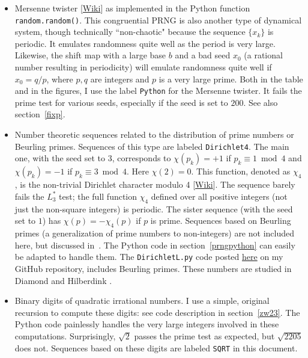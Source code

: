 \documentclass[oneside,10pt]{book}
\begin{document}
\begin{itemize}
\item \textcolor{index}{Mersenne twister} [\href{https://en.wikipedia.org/wiki/Mersenne_Twister}{Wiki}] as
 implemented in the Python function \texttt{random.random()}. This congruential PRNG is also another type of dynamical system,
 though technically ``non-chaotic" because the sequence $\{x_k\}$
is periodic. It emulates randomness quite well as the period is very large.
 Likewise, the shift map with a large base $b$ and a bad seed $x_0$ (a rational number resulting in periodicity) will emulate
 randomness quite well if $x_0=q/p$, where $p,q$ are integers and $p$ is a very large prime. Both in the table and in the figures, I use the label \texttt{Python} for the Mersenne twister. It fails the prime test for various seeds, especially if the seed is set to $200$. See also section~\ref{fixp}.
\item Number theoretic sequences related to the distribution of prime numbers or
 \textcolor{index}{Beurling primes}. Sequences of this type are labeled \texttt{Dirichlet4}. The main one, with the seed set to $3$, corresponds to
 $\chi(p_k)=+1$ if $p_k \equiv 1 \bmod 4$ and $\chi(p_k)=-1$ if $p_k \equiv 3\bmod 4$. Here $\chi(2)=0$. This function, denoted as $\chi_4$, is the non-trivial \textcolor{index}{Dirichlet character modulo 4} [\href{https://en.wikipedia.org/wiki/Dirichlet_character}{Wiki}]. The sequence barely fails the $L^*_3$ test; the full function $\chi_4$ defined over all positive integers (not just the non-square integers) is periodic. The sister sequence (with the seed set to $1$) has
 $\chi(p)=-\chi_4(p)$ if $p$ is prime. Sequences based on Beurling primes (a generalization of prime numbers to non-integers) are not included here, but discussed in~\cite{vgsynthetic}. The Python code
in section~\ref{prngpython} can easily be adapted to handle them. The \texttt{DirichletL.py} code posted
 \href{https://github.com/VincentGranville/Experimental-Math-Number-Theory/blob/main/Source-Code/dirichletL.py}{here} on my GitHub repository, includes Beurling primes.  These numbers are studied in
 Diamond \cite{wen2016} and Hilberdink  \cite{bzf2004}.
\item Binary digits of \textcolor{index}{quadratic irrational} numbers. I use a simple, original recursion to compute these
digits: see code description in section~\ref{zw23}. The Python code painlessly handles the very large integers involved in these computations. Surprisingly, $\sqrt{2}$ passes the prime test as expected, but $\sqrt{2205}$ does not. Sequences based on these digits are labeled \texttt{SQRT} in this document.
\end{itemize}
\end{document}
